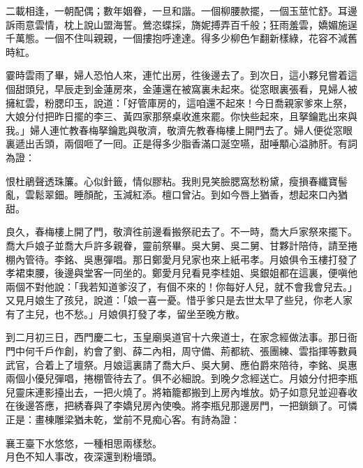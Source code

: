 \begin{myquote}
二載相逢，一朝配偶；數年姻眷，一旦和諧。一個柳腰款擺，一個玉莖忙舒。耳邊訴雨意雲情，枕上說山盟海誓。鶯恣蝶採，旖妮搏弄百千般；狂雨羞雲，嬌媚施逞千萬態。一個不住叫親親，一個摟抱呼達達。得多少柳色乍翻新樣綠，花容不減舊時紅。
\end{myquote}

霎時雲雨了畢，婦人恐怕人來，連忙出房，徃後邊去了。到次日，這小夥兒嘗着這個甜頭兒，早辰走到金蓮房來，金蓮還在被窩裏未起來。從窓眼裏張看，見婦人被擁紅雲，粉腮印玉，說道：「好管庫房的，這咱還不起來！今日喬親家爹來上祭，大娘分付把昨日擺的李三、黃四家那祭桌收進來罷。你快些起來，且拏鑰匙出來與我。」婦人連忙教春梅拏鑰匙與敬濟，敬濟先教春梅樓上開門去了。婦人便從窓眼裏遞出舌頭，兩個咂了一囘。正是得多少脂香滿口涎空嚥，甜唾顒心溢肺肝。有詞為證：

\begin{myquote}
恨杜鵑聲透珠簾。心似針籤，情似膠粘。我則見笑臉腮窩愁粉黛，瘦損春纖寶髻亂，雲鬆翠鈿。睡顏酡，玉減紅添。檀口曾沾。到如今唇上猶香，想起來口內猶甜。
\end{myquote}

良久，春梅樓上開了門，敬濟徃前邊看搬祭祀去了。不一時，喬大戶家祭來擺下。喬大戶娘子並喬大戶許多親眷，靈前祭畢。吳大舅、吳二舅、甘夥計陪侍，請至捲棚內管待。李銘、吳惠彈唱。那日鄭愛月兒家也來上紙弔孝。月娘俱令玉樓打發了孝裙束腰，後邊與堂客一同坐的。鄭愛月兒看見李桂姐、吳銀姐都在這裏，便嗔他兩個不對他說：「我若知道爹沒了，有個不來的！你每好人兒，就不會我會兒去。」又見月娘生了孩兒，說道：「娘一喜一憂。惜乎爹只是去世太早了些兒，你老人家有了主兒，也不愁。」月娘俱打發了孝，留坐至晚方散。

到二月初三日，西門慶二七，玉皇廟吳道官十六衆道士，在家念經做法事。那日衙門中何千戶作創，約會了劉、薛二內相，周守備、荊都統、張團練、雲指揮等數員武官，合着上了壇祭。月娘這裏請了喬大戶、吳大舅、應伯爵來陪待，李銘、吳惠兩個小優兒彈唱，捲棚管待去了。俱不必細說。到晚夕念經送亡。月娘分付把李瓶兒靈床連影擡出去，一把火燒了。將箱籠都搬到上房內堆放。奶子如意兒並迎春收在後邊答應，把綉春與了李嬌兒房內使喚。將李瓶兒那邊房門，一把鎖鎖了。可憐正是：畫棟雕梁猶未乾，堂前不見痴心客。有詩為證：

\begin{myquote}
襄王臺下水悠悠，一種相思兩樣愁。\\月色不知人事改，夜深還到粉墻頭。
\end{myquote}

